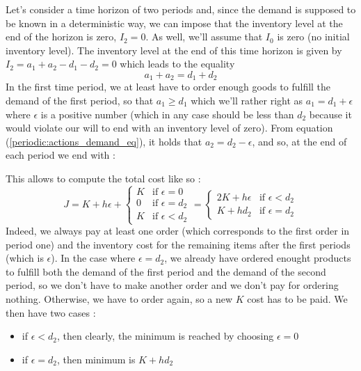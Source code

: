 Let's consider a time horizon of two periods and, since the demand is supposed to be known in a deterministic way, we can impose that the inventory level at the end of the horizon is zero, $I_2=0$. As well, we'll assume that $I_0$ is zero (no initial inventory level). The inventory level at the end of this time horizon is given by $I_2 = a_1 + a_2 - d_1 - d_2 = 0$ which leads to the equality \begin{equation} a_1 + a_2 = d_1 + d_2 \label{periodic:actions_demand_eq} \end{equation}
In the first time period, we at least have to order enough goods to fulfill the demand of the first period, so that $a_1\ge d_1$ which we'll rather right as $a_1 = d_1 + \epsilon$ where $\epsilon$ is a positive number (which in any case should be less than $d_2$ because it would violate our will to end with an inventory level of zero). From equation (\ref{periodic:actions_demand_eq}), it holds that $a_2 = d_2 - \epsilon$, and so, at the end of each period we end with :

\begin{center}
\end{center}

This allows to compute the total cost like so :
\[
    J = K + h\epsilon +
    \begin{cases}
        K &\textrm{if }\epsilon = 0\\
        0 &\textrm{if }\epsilon = d_2\\
        K &\textrm{if }\epsilon < d_2
    \end{cases}
    = \begin{cases}
        2K+h\epsilon&\textrm{if }\epsilon<d_2\\
        K+hd_2&\textrm{if }\epsilon = d_2
    \end{cases}
\]
Indeed, we always pay at least one order (which corresponds to the first order in period one) and the inventory cost for the remaining items after the first periods (which is $\epsilon$). In the case where $\epsilon = d_2$, we already have ordered enought products to fulfill both the demand of the first period and the demand of the second period, so we don't have to make another order and we don't pay for ordering nothing. Otherwise, we have to order again, so a new $K$ cost has to be paid. We then have two cases :
\begin{itemize}
    \item if $\epsilon < d_2$, then clearly, the minimum is reached by choosing $\epsilon = 0$
    \item if $\epsilon = d_2$, then minimum is $K+hd_2$
\end{itemize}

